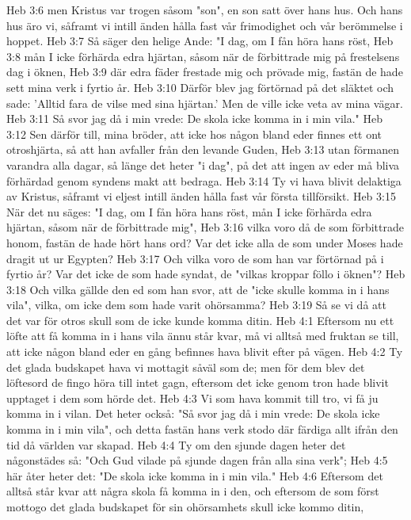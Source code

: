 Heb 3:6  men Kristus var trogen såsom "son", en son satt över hans hus. Och hans hus äro vi, såframt vi intill änden hålla fast vår frimodighet och vår berömmelse i hoppet.
Heb 3:7  Så säger den helige Ande: "I dag, om I fån höra hans röst,
Heb 3:8  mån I icke förhärda edra hjärtan, såsom när de förbittrade mig på frestelsens dag i öknen,
Heb 3:9  där edra fäder frestade mig och prövade mig, fastän de hade sett mina verk i fyrtio år.
Heb 3:10  Därför blev jag förtörnad på det släktet och sade: 'Alltid fara de vilse med sina hjärtan.' Men de ville icke veta av mina vägar.
Heb 3:11  Så svor jag då i min vrede: De skola icke komma in i min vila."
Heb 3:12  Sen därför till, mina bröder, att icke hos någon bland eder finnes ett ont otroshjärta, så att han avfaller från den levande Guden,
Heb 3:13  utan förmanen varandra alla dagar, så länge det heter "i dag", på det att ingen av eder må bliva förhärdad genom syndens makt att bedraga.
Heb 3:14  Ty vi hava blivit delaktiga av Kristus, såframt vi eljest intill änden hålla fast vår första tillförsikt.
Heb 3:15  När det nu säges: "I dag, om I fån höra hans röst, mån I icke förhärda edra hjärtan, såsom när de förbittrade mig",
Heb 3:16  vilka voro då de som förbittrade honom, fastän de hade hört hans ord? Var det icke alla de som under Moses hade dragit ut ur Egypten?
Heb 3:17  Och vilka voro de som han var förtörnad på i fyrtio år? Var det icke de som hade syndat, de "vilkas kroppar föllo i öknen"?
Heb 3:18  Och vilka gällde den ed som han svor, att de "icke skulle komma in i hans vila", vilka, om icke dem som hade varit ohörsamma?
Heb 3:19  Så se vi då att det var för otros skull som de icke kunde komma ditin.
Heb 4:1  Eftersom nu ett löfte att få komma in i hans vila ännu står kvar, må vi alltså med fruktan se till, att icke någon bland eder en gång befinnes hava blivit efter på vägen.
Heb 4:2  Ty det glada budskapet hava vi mottagit såväl som de; men för dem blev det löftesord de fingo höra till intet gagn, eftersom det icke genom tron hade blivit upptaget i dem som hörde det.
Heb 4:3  Vi som hava kommit till tro, vi få ju komma in i vilan. Det heter också: "Så svor jag då i min vrede: De skola icke komma in i min vila", och detta fastän hans verk stodo där färdiga allt ifrån den tid då världen var skapad.
Heb 4:4  Ty om den sjunde dagen heter det någonstädes så: "Och Gud vilade på sjunde dagen från alla sina verk";
Heb 4:5  här åter heter det: "De skola icke komma in i min vila."
Heb 4:6  Eftersom det alltså står kvar att några skola få komma in i den, och eftersom de som först mottogo det glada budskapet för sin ohörsamhets skull icke kommo ditin,
